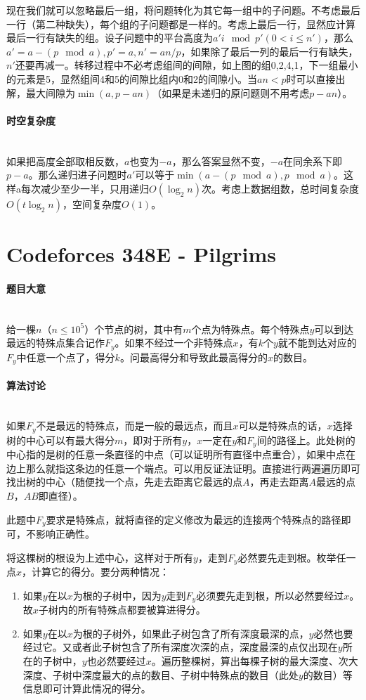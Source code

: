 \documentclass[UTF8]{ctexart}
\newcommand{\myparagraph}[1]{\paragraph{#1}\mbox{}\\}
\theoremstyle{nonumberplain}
\begin{document}
			现在我们就可以忽略最后一组，将问题转化为其它每一组中的子问题。不考虑最后一行（第二种缺失），每个组的子问题都是一样的。考虑上最后一行，显然应计算最后一行有缺失的组。设子问题中的平台高度为$a'i \mod p' (0<i \leq n')$，那么$a'=a-(p \mod a), p'=a, n'=an/p$，如果除了最后一列的最后一行有缺失，$n'$还要再减一。转移过程中不必考虑组间的间隙，如上图的组0,2,4,1，下一组最小的元素是5，显然组间4和5的间隙比组内0和2的间隙小。当$an<p$时可以直接出解，最大间隙为$\min(a,p-an)$（如果是未递归的原问题则不用考虑$p-an$）。
		
		\myparagraph{时空复杂度}
		
			如果把高度全部取相反数，$a$也变为$-a$，那么答案显然不变，$-a$在同余系下即$p-a$。那么递归进子问题时$a'$可以等于$\min(a-(p \mod a), p \mod a)$。这样a每次减少至少一半，只用递归$O(\log_2n)$次。考虑上数据组数，总时间复杂度$O(t\log_2n)$，空间复杂度$O(1)$。
	
	\section{Codeforces 348E - Pilgrims}
	
		\myparagraph{题目大意}
		
			给一棵$n$（$n \leq 10^5$）个节点的树，其中有$m$个点为特殊点。每个特殊点$y$可以到达最远的特殊点集合记作$F_y$。如果不经过一个非特殊点$x$，有$k$个$y$就不能到达对应的$F_y$中任意一个点了，得分$k$。问最高得分和导致此最高得分的$x$的数目。
		
		\myparagraph{算法讨论}
		
			如果$F_y$不是最远的特殊点，而是一般的最远点，而且$x$可以是特殊点的话，$x$选择树的中心可以有最大得分$m$，即对于所有$y$，$x$一定在$y$和$F_y$间的路径上。此处树的中心指的是树的任意一条直径的中点（可以证明所有直径中点重合），如果中点在边上那么就指这条边的任意一个端点。可以用反证法证明。直接进行两遍遍历即可找出树的中心（随便找一个点，先走去距离它最远的点$A$，再走去距离$A$最远的点$B$，$AB$即直径）。
			
			此题中$F_y$要求是特殊点，就将直径的定义修改为最远的连接两个特殊点的路径即可，不影响正确性。
			
			将这棵树的根设为上述中心，这样对于所有$y$，走到$F_y$必然要先走到根。枚举任一点$x$，计算它的得分。要分两种情况：
			
			\begin{enumerate}
				\item 如果$y$在以$x$为根的子树中，因为$y$走到$F_y$必须要先走到根，所以必然要经过$x$。故$x$子树内的所有特殊点都要被算进得分。
				\item 如果$y$在以$x$为根的子树外，如果此子树包含了所有深度最深的点，$y$必然也要经过它。又或者此子树包含了所有深度次深的点，深度最深的点仅出现在$y$所在的子树中，$y$也必然要经过$x$。遍历整棵树，算出每棵子树的最大深度、次大深度、子树中深度最大的点的数目、子树中特殊点的数目（此处$y$的数目）等信息即可计算此情况的得分。
			\end{enumerate}
		
\end{document}
